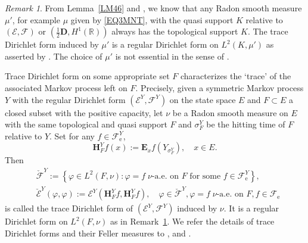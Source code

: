 \documentclass[a4paper]{amsart}
\theoremstyle{definition}
\theoremstyle{remark}
\newtheorem{remark}[theorem]{Remark}
\numberwithin{equation}{section}
\begin{document}
\begin{remark}\label{RM36}
From Lemma~\ref{LM46} and \cite[Lemma~5.2.9~(iii)]{CF12}, we know that any Radon smooth measure $\mu'$, for example $\mu$ given by \eqref{EQ3MNT}, with the quasi support $K$ relative to $({{\mathcal{E}}},{{\mathcal{F}}})$ or $(\frac{1}{2}\mathbf{D}, H^1(\mathbb{R}))$ always has the topological support $K$. The trace Dirichlet form induced by $\mu'$ is a regular Dirichlet form on $L^2(K,\mu')$ as asserted by \cite[Corollary~5.2.10]{CF12}. The choice of $\mu'$ is not essential in the sense of \cite[Theorem~5.2.15]{CF12}.
\end{remark}

Trace Dirichlet form on some appropriate set $F$ characterizes the `trace' of the associated Markov process left on $F$. Precisely, given a symmetric Markov process $Y$ with the regular Dirichlet form $({{\mathcal{E}}}^Y, {{\mathcal{F}}}^Y)$ on the state space $E$ and $F\subset E$ a closed subset with the positive capacity, let $\nu$ be a Radon smooth measure on $E$ with the same topological and quasi support $F$ and $\sigma_F^Y$ be the hitting time of $F$ relative to $Y$. Set for any $f\in {{\mathcal{F}}}^Y_\mathrm{e}$,
\[
	\mathbf{H}^Y_Ff(x):=\mathbf{E}_x f(Y_{\sigma^Y_F}),\quad x\in E.
\]
Then
\[
\begin{aligned}
&\check{{\mathcal{F}}}^Y:=\left\{ \varphi\in L^2(F,\nu): \varphi=f\; \nu\text{-a.e. on }F \text{ for some } f\in {{\mathcal{F}}}^Y_\mathrm{e}\right\},   \\
&\check{{\mathcal{E}}}^Y(\varphi, \varphi):={{\mathcal{E}}}^Y(\mathbf{H}^Y_Ff, \mathbf{H}^Y_Ff), \quad \varphi\in \check{{\mathcal{F}}}^Y, \varphi=f\; \nu\text{-a.e. on }F, f\in {{\mathcal{F}}}_\mathrm{e}
\end{aligned}
\]
is called the trace Dirichlet form of $({{\mathcal{E}}}^Y,{{\mathcal{F}}}^Y)$ induced by $\nu$. It is a regular Dirichlet form on $L^2(F,\nu)$ as in Remark~\ref{RM36}.
We refer the details of trace Dirichlet forms and their Feller measures to \cite{CFY06}, \cite[\S5.5]{CF12} and \cite{LY14}.
\end{document}
